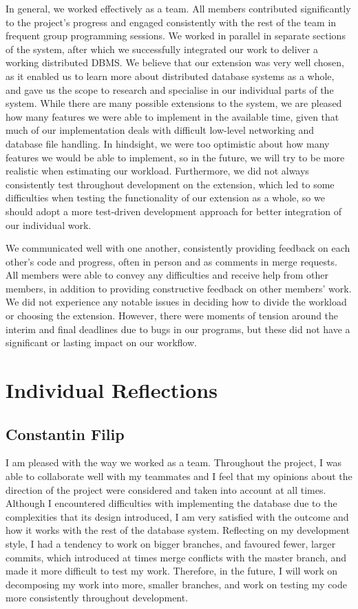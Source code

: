 \documentclass[11pt]{article}
\begin{document}
In general, we worked effectively as a team. All members contributed significantly to the project's progress and engaged consistently with the rest of the team in frequent group programming sessions. We worked in parallel in separate sections of the system, after which we successfully integrated our work to deliver a working distributed DBMS. We believe that our extension was very well chosen, as it enabled us to learn more about distributed database systems as a whole, and gave us the scope to research and specialise in our individual parts of the system. While there are many possible extensions to the system, we are pleased how many features we were able to implement in the available time, given that much of our implementation deals with difficult low-level networking and database file handling. In hindsight, we were too optimistic about how many features we would be able to implement, so in the future, we will try to be more realistic when estimating our workload. Furthermore, we did not always consistently test throughout development on the extension, which led to some difficulties when testing the functionality of our extension as a whole, so we should adopt a more test-driven development approach for better integration of our individual work.

We communicated well with one another, consistently providing feedback on each other's code and progress, often in person and as comments in merge requests. All members were able to convey any difficulties and receive help from other members, in addition to providing constructive feedback on other members' work. We did not experience any notable issues in deciding how to divide the workload or choosing the extension. However, there were moments of tension around the interim and final deadlines due to bugs in our programs, but these did not have a significant or lasting impact on our workflow.

\section{Individual Reflections}

\subsection{Constantin Filip}

I am pleased with the way we worked as a team. Throughout the project, I was able to collaborate well with my teammates and I feel that my opinions about the direction of the project were considered and taken into account at all times. Although I encountered difficulties with implementing the database due to the complexities that its design introduced, I am very satisfied with the outcome and how it works with the rest of the database system. Reflecting on my development style, I had a tendency to work on bigger branches, and favoured fewer, larger commits, which introduced at times merge conflicts with the master branch, and made it more difficult to test my work. Therefore, in the future, I will work on decomposing my work into more, smaller branches, and work on testing my code more consistently throughout development.
\end{document}
